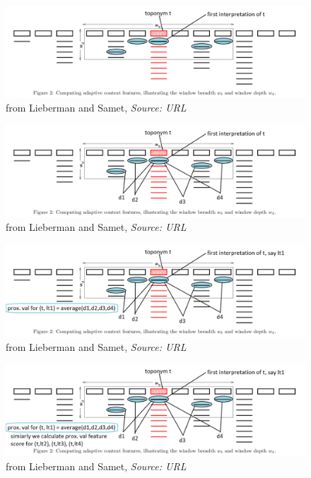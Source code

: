 \documentclass{beamer}
\begin{document}
{\begin{overprint}
		\begin{figure}
			\includegraphics[width=\textwidth]{adaptive-proximity-k.png} 
			\caption{from Lieberman and Samet, \textit{Source: URL}}
		\end{figure}
		
		\begin{figure}
			\includegraphics[width=\textwidth]{adaptive-proximity-k1.png} 
			\caption{from Lieberman and Samet, \textit{Source: URL}}
		\end{figure}
		
		\begin{figure}
			\includegraphics[width=\textwidth]{adaptive-proximity-k2.png} 
			\caption{from Lieberman and Samet, \textit{Source: URL}}
		\end{figure}
		
		\begin{figure}
			\includegraphics[width=\textwidth]{adaptive-proximity-k3.png} 
			\caption{from Lieberman and Samet, \textit{Source: URL}}
		\end{figure}
		

\end{overprint}}
\end{document}
